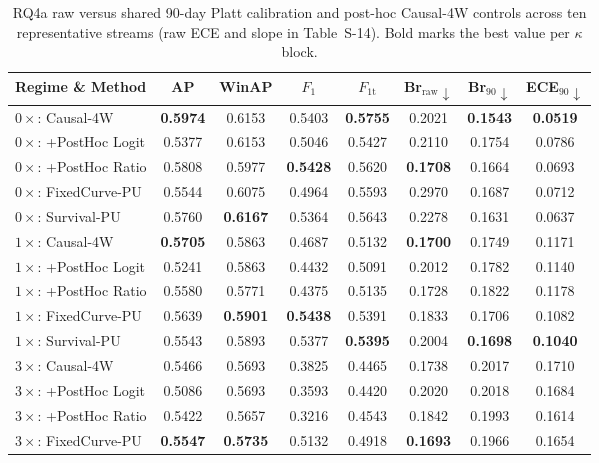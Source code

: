 \documentclass[pdflatex,sn-basic]{sn-jnl}
\theoremstyle{definition}
\theoremstyle{plain}
\begin{document}
\begin{table}[t]
\centering
\caption{RQ4a raw versus shared 90-day Platt calibration and post-hoc Causal-4W controls across ten representative streams (raw ECE and slope in Table~S-14). Bold marks the best value per $\kappa$ block.}
\label{tab:rq4a_posthoc_b2}
\fontsize{7.5}{9.0}\selectfont
\setlength{\tabcolsep}{1.2pt}
\begin{tabular*}{\textwidth}{@{\extracolsep\fill}lccccccc@{}}
\toprule
\textbf{Regime \& Method} & \textbf{AP} & \textbf{WinAP} & \textbf{$F_1$} & \textbf{$F_{1\mathrm{t}}$} & \textbf{Br$_{\mathrm{raw}}\downarrow$} & \textbf{Br$_{90}\downarrow$} & \textbf{ECE$_{90}\downarrow$} \\
\midrule
$0\times$: Causal-4W & \textbf{0.5974} & 0.6153 & 0.5403 & \textbf{0.5755} & 0.2021 & \textbf{0.1543} & \textbf{0.0519} \\
$0\times$: +PostHoc Logit & 0.5377 & 0.6153 & 0.5046 & 0.5427 & 0.2110 & 0.1754 & 0.0786 \\
$0\times$: +PostHoc Ratio & 0.5808 & 0.5977 & \textbf{0.5428} & 0.5620 & \textbf{0.1708} & 0.1664 & 0.0693 \\
$0\times$: FixedCurve-PU & 0.5544 & 0.6075 & 0.4964 & 0.5593 & 0.2970 & 0.1687 & 0.0712 \\
$0\times$: Survival-PU & 0.5760 & \textbf{0.6167} & 0.5364 & 0.5643 & 0.2278 & 0.1631 & 0.0637 \\
\midrule
$1\times$: Causal-4W & \textbf{0.5705} & 0.5863 & 0.4687 & 0.5132 & \textbf{0.1700} & 0.1749 & 0.1171 \\
$1\times$: +PostHoc Logit & 0.5241 & 0.5863 & 0.4432 & 0.5091 & 0.2012 & 0.1782 & 0.1140 \\
$1\times$: +PostHoc Ratio & 0.5580 & 0.5771 & 0.4375 & 0.5135 & 0.1728 & 0.1822 & 0.1178 \\
$1\times$: FixedCurve-PU & 0.5639 & \textbf{0.5901} & \textbf{0.5438} & 0.5391 & 0.1833 & 0.1706 & 0.1082 \\
$1\times$: Survival-PU & 0.5543 & 0.5893 & 0.5377 & \textbf{0.5395} & 0.2004 & \textbf{0.1698} & \textbf{0.1040} \\
\midrule
$3\times$: Causal-4W & 0.5466 & 0.5693 & 0.3825 & 0.4465 & 0.1738 & 0.2017 & 0.1710 \\
$3\times$: +PostHoc Logit & 0.5086 & 0.5693 & 0.3593 & 0.4420 & 0.2020 & 0.2018 & 0.1684 \\
$3\times$: +PostHoc Ratio & 0.5422 & 0.5657 & 0.3216 & 0.4543 & 0.1842 & 0.1993 & 0.1614 \\
$3\times$: FixedCurve-PU & \textbf{0.5547} & \textbf{0.5735} & 0.5132 & 0.4918 & \textbf{0.1693} & 0.1966 & 0.1654 \\

\end{tabular*}
\end{table}
\end{document}
